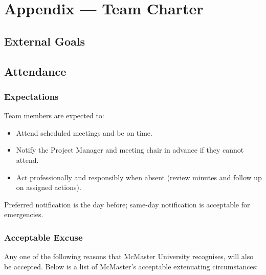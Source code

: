 \documentclass{article}
\begin{document}
\newpage{}

\section*{Appendix --- Team Charter}


\subsection*{External Goals}


\subsection*{Attendance}

\subsubsection*{Expectations}

Team members are expected to: 
\begin{itemize}
  \item Attend scheduled meetings and be on time.
  \item Notify the Project Manager and meeting chair in advance if they cannot attend.
  \item Act professionally and responsibly when absent (review minutes and follow up on assigned actions).
\end{itemize}

Preferred notification is the day before; same-day notification is acceptable for emergencies.

\subsubsection*{Acceptable Excuse}

Any one of the following reasons that McMaster University recognises, will also be accepted. Below is a list of McMaster's acceptable extenuating circumstances:
\end{document}
